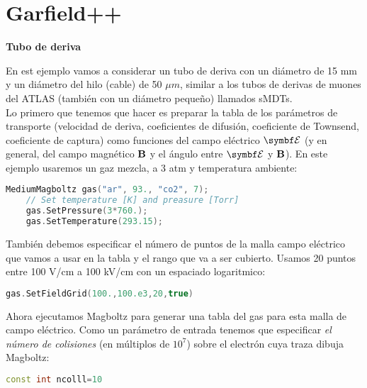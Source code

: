 \chapter{Garfield++}


\begin{Ejemplo}{\textbf{Tubo de deriva}}

    En est ejemplo vamos a considerar un tubo de deriva con un diámetro de 15 mm y un diámetro del hilo (cable) de 50 $\mu m$, similar a los tubos de derivas de muones del ATLAS (también con un diámetro pequeño) llamados sMDTs. \\


    Lo primero que tenemos que hacer es preparar la tabla de los parámetros de transporte (velocidad de deriva, coeficientes de difusión, coeficiente de Townsend, coeficiente de captura) como funciones del campo eléctrico $\Encal$ (y en general, del campo magnético $\mathbf{B}$ y el ángulo entre $\Encal$ y $\mathbf{B}$). En este ejemplo usaremos un gaz mezcla, a 3 atm y temperatura ambiente: 

    \begin{lstlisting}[language=C++,style=c++]
    MediumMagboltz gas("ar", 93., "co2", 7);
    // Set temperature [K] and preasure [Torr]
    gas.SetPressure(3*760.);
    gas.SetTemperature(293.15);
    \end{lstlisting}

    También debemos especificar el número de puntos de la malla campo eléctrico que vamos a usar en la tabla y el rango que va a ser cubierto. Usamos 20 puntos entre 100 V/cm a 100 kV/cm con un espaciado logaritmico:  

    \begin{lstlisting}[language=C++,style=c++]
    gas.SetFieldGrid(100.,100.e3,20,true)
    \end{lstlisting}
    Ahora ejecutamos Magboltz para generar una tabla del gas para esta malla de campo eléctrico. Como un parámetro de entrada tenemos que especificar \textit{el número de colisiones} (en múltiplos de $10^7$) sobre el electrón cuya traza dibuja Magboltz: 

    \begin{lstlisting}[language=C++,style=c++]
    const int ncolll=10
    \end{lstlisting} 
    
\end{Ejemplo}